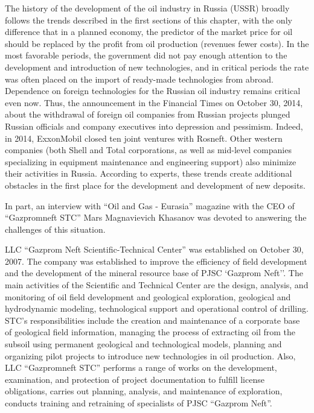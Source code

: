 \documentclass[12pt]{report}
\theoremstyle{definition}
\begin{document}
The history of the development of the oil industry in Russia (USSR) broadly follows the trends described in the first sections of this chapter, with the only difference that in a planned economy, the predictor of the market price for oil should be replaced by the profit from oil production (revenues fewer costs).
In the most favorable periods, the government did not pay enough attention to the development and introduction of new technologies, and in critical periods the rate was often placed on the import of ready-made technologies from abroad.
Dependence on foreign technologies for the Russian oil industry remains critical even now.
Thus, the announcement in the Financial Times on October 30, 2014, about the withdrawal of foreign oil companies from Russian projects plunged Russian officials and company executives into depression and pessimism.
Indeed, in 2014, ExxonMobil closed ten joint ventures with Rosneft.
Other western companies (both Shell and Total corporations, as well as mid-level companies specializing in equipment maintenance and engineering support) also minimize their activities in Russia.
According to experts, these trends create additional obstacles in the first place for the development and development of new deposits.

In part, an interview with ``Oil and Gas - Eurasia'' magazine with the CEO of ``Gazpromneft STC'' Mars Magnavievich Khasanov was devoted to answering the challenges of this situation.

LLC ``Gazprom Neft Scientific-Technical Center'' was established on October 30, 2007.
The company was established to improve the efficiency of field development and the development of the mineral resource base of PJSC `Gazprom Neft''.
The main activities of the Scientific and Technical Center are the design, analysis, and monitoring of oil field development and geological exploration, geological and hydrodynamic modeling, technological support and operational control of drilling.
STC’s responsibilities include the creation and maintenance of a corporate base of geological field information, managing the process of extracting oil from the subsoil using permanent geological and technological models, planning and organizing pilot projects to introduce new technologies in oil production.
Also, LLC ``Gazpromneft STC'' performs a range of works on the development, examination, and protection of project documentation to fulfill license obligations, carries out planning, analysis, and maintenance of exploration, conducts training and retraining of specialists of PJSC ``Gazprom Neft''.
\end{document}

